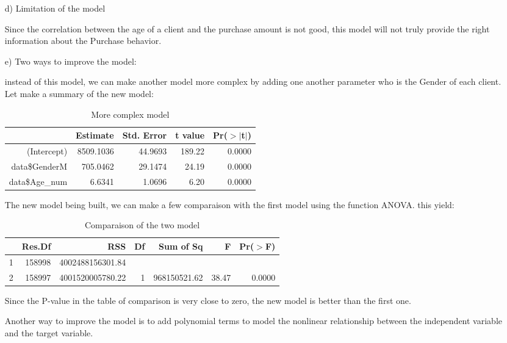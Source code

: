 \documentclass[11pt,a4paper]{article}
\begin{document}
\begin{enumerate}
\item[d)] Limitation of the model

Since the correlation between the age of a client and the purchase amount is not good, this model will not truly provide 
the right information about the Purchase behavior. 
 
\item[e)] Two ways to improve the model:

instead of this model, we can make another model more complex by adding one another parameter who is the Gender of each client. Let make a summary of the new model:

\begin{table}[ht]
	\caption{More complex model}
	\centering
	\begin{tabular}{rrrrr}
		\hline
		& Estimate & Std. Error & t value & Pr($>$$|$t$|$) \\ 
		\hline
		(Intercept) & 8509.1036 & 44.9693 & 189.22 & 0.0000 \\ 
		data\$GenderM & 705.0462 & 29.1474 & 24.19 & 0.0000 \\ 
		data\$Age\_num & 6.6341 & 1.0696 & 6.20 & 0.0000 \\ 
		\hline
	\end{tabular}
\end{table}
The new model being built, we can make a few comparaison with the first model using the function ANOVA. this yield:


\begin{table}[ht]
	\caption{Comparaison of the two model}
	\centering
	\begin{tabular}{lrrrrrr}
		\hline
		& Res.Df & RSS & Df & Sum of Sq & F & Pr($>$F) \\ 
		\hline
		1 & 158998 & 4002488156301.84 &  &  &  &  \\ 
		2 & 158997 & 4001520005780.22 & 1 & 968150521.62 & 38.47 & 0.0000 \\ 
		\hline
	\end{tabular}
\end{table}
Since the P-value in the table of comparison is very close to zero, the new model is better than the first one.

Another way to improve the model is to add polynomial terms to model the nonlinear relationship between the independent variable and the target variable.
\end{enumerate}
\end{document}
